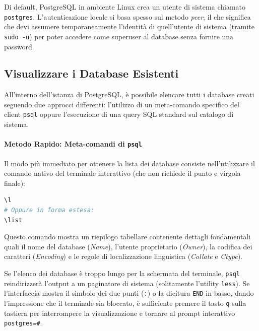 \begin{warningbox}
Di default, PostgreSQL in ambiente Linux crea un utente di sistema chiamato \texttt{postgres}. L'autenticazione locale si basa spesso sul metodo \textit{peer}, il che significa che devi assumere temporaneamente l'identità di quell'utente di sistema (tramite \texttt{sudo -u}) per poter accedere come superuser al database senza fornire una password.
\end{warningbox}

\subsection{Visualizzare i Database Esistenti}

All'interno dell'istanza di PostgreSQL, è possibile elencare tutti i database creati seguendo due approcci differenti: l'utilizzo di un meta-comando specifico del client \texttt{psql} oppure l'esecuzione di una query SQL standard sul catalogo di sistema.

\paragraph{Metodo Rapido: Meta-comandi di \texttt{psql}}

Il modo più immediato per ottenere la lista dei database consiste nell'utilizzare il comando nativo del terminale interattivo (che non richiede il punto e virgola finale):

\begin{lstlisting}[language=bash, title=Meta-comando psql]
\l
# Oppure in forma estesa:
\list
\end{lstlisting}

Questo comando mostra un riepilogo tabellare contenente dettagli fondamentali quali il nome del database (\textit{Name}), l'utente proprietario (\textit{Owner}), la codifica dei caratteri (\textit{Encoding}) e le regole di localizzazione linguistica (\textit{Collate} e \textit{Ctype}).

\begin{dettagli}
Se l'elenco dei database è troppo lungo per la schermata del terminale, \texttt{psql} reindirizzerà l'output a un paginatore di sistema (solitamente l'utility \texttt{less}). Se l'interfaccia mostra il simbolo dei due punti (\texttt{:}) o la dicitura \texttt{END} in basso, dando l'impressione che il terminale sia bloccato, è sufficiente premere il tasto \texttt{q} sulla tastiera per interrompere la visualizzazione e tornare al prompt interattivo \texttt{postgres=\#}.
\end{dettagli}

